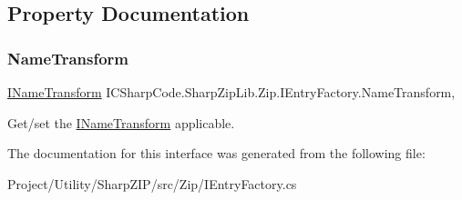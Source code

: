 \subsection{Property Documentation}
\mbox{\label{interface_i_c_sharp_code_1_1_sharp_zip_lib_1_1_zip_1_1_i_entry_factory_a64ca753509472a47cd72acd4cb754c28}} 
\subsubsection{\texorpdfstring{Name\+Transform}{NameTransform}}
{\footnotesize\ttfamily \hyperlink{interface_i_c_sharp_code_1_1_sharp_zip_lib_1_1_core_1_1_i_name_transform}{I\+Name\+Transform} I\+C\+Sharp\+Code.\+Sharp\+Zip\+Lib.\+Zip.\+I\+Entry\+Factory.\+Name\+Transform\hspace{0.3cm}{\ttfamily [get]}, {\ttfamily [set]}}



Get/set the \hyperlink{}{I\+Name\+Transform} applicable. 



The documentation for this interface was generated from the following file\+:\begin{DoxyCompactItemize}
\item 
Project/\+Utility/\+Sharp\+Z\+I\+P/src/\+Zip/I\+Entry\+Factory.\+cs\end{DoxyCompactItemize}
